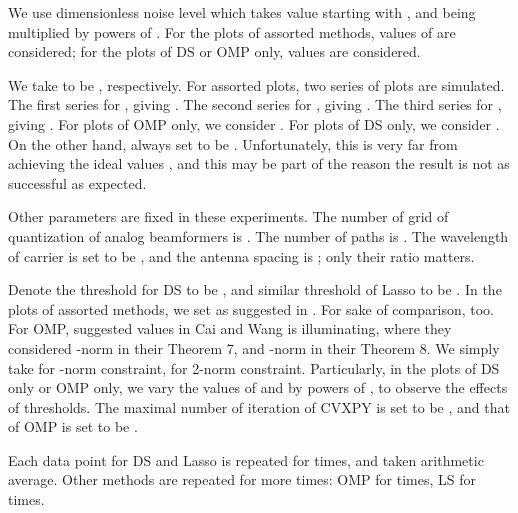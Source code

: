 We use dimensionless noise level \m {\s} which takes value starting with , and being multiplied by powers of .
For the plots of assorted methods,  values of \m {\s} are considered; for the plots of DS or OMP only,  values are considered.

We take  to be , respectively.
For assorted plots, two series of plots are simulated.
The first series for , giving .
The second series for , giving .
The third series for , giving .
For plots of OMP only, we consider .
For plots of DS only, we consider .
On the other hand,  always set to be .
Unfortunately, this is very far from achieving the ideal values , and this may be part of the reason the result is not as successful as expected.

Other parameters are fixed in these experiments.
The number of grid of quantization of analog beamformers is .
The number of paths  is .
The wavelength of carrier  is set to be , and the antenna spacing  is ; only their ratio matters.


Denote the threshold for DS to be , and similar threshold of Lasso to be .
In the plots of assorted methods, we set  as suggested in \cite {CaT07}.
For sake of comparison,  too.
For OMP, suggested values in Cai and Wang \cite {CaW11} is illuminating, where they considered -norm in their Theorem 7, and \m {\ell _\infty}-norm in their Theorem 8.
We simply take  for \m {\infty}-norm constraint,  for 2-norm constraint.
Particularly, in the plots of DS only or OMP only, we vary the values of  and  by powers of , to observe the effects of thresholds.
The maximal number of iteration of CVXPY is set to be , and that of OMP is set to be .

Each data point for DS and Lasso is repeated for  times, and taken arithmetic average.
Other methods are repeated for more times: OMP for  times, LS for  times.

